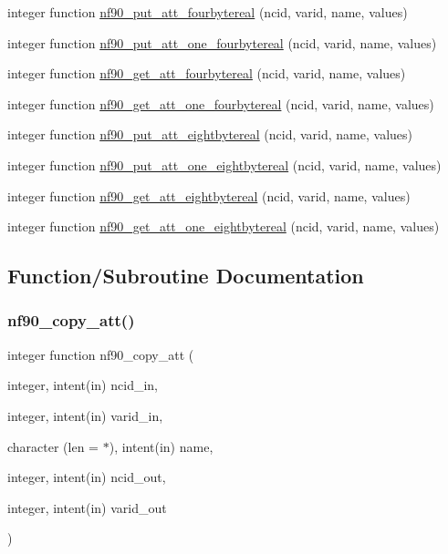 \begin{DoxyCompactItemize}
\item 
integer function \hyperlink{netcdf__attributes_8f90_a19a744e71982424f0959ba3694ec27ef}{nf90\+\_\+put\+\_\+att\+\_\+fourbytereal} (ncid, varid, name, values)
\item 
integer function \hyperlink{netcdf__attributes_8f90_aedfd0d57d585bb455050d55f04872273}{nf90\+\_\+put\+\_\+att\+\_\+one\+\_\+fourbytereal} (ncid, varid, name, values)
\item 
integer function \hyperlink{netcdf__attributes_8f90_a1f0e09b16f01e6e4b9deacba403bac61}{nf90\+\_\+get\+\_\+att\+\_\+fourbytereal} (ncid, varid, name, values)
\item 
integer function \hyperlink{netcdf__attributes_8f90_aea7a3824f9ca8df04723def3de3ff9c2}{nf90\+\_\+get\+\_\+att\+\_\+one\+\_\+fourbytereal} (ncid, varid, name, values)
\item 
integer function \hyperlink{netcdf__attributes_8f90_ade183ddaf5b09e6487a3dcf797d2686c}{nf90\+\_\+put\+\_\+att\+\_\+eightbytereal} (ncid, varid, name, values)
\item 
integer function \hyperlink{netcdf__attributes_8f90_ab3ab0461f63ffd2f1067ed51a7a75aa0}{nf90\+\_\+put\+\_\+att\+\_\+one\+\_\+eightbytereal} (ncid, varid, name, values)
\item 
integer function \hyperlink{netcdf__attributes_8f90_a89dc7198d6cec513e5ada471a0fe7a37}{nf90\+\_\+get\+\_\+att\+\_\+eightbytereal} (ncid, varid, name, values)
\item 
integer function \hyperlink{netcdf__attributes_8f90_a6149e70bb700cb94ea5f140a3035edfa}{nf90\+\_\+get\+\_\+att\+\_\+one\+\_\+eightbytereal} (ncid, varid, name, values)
\end{DoxyCompactItemize}


\subsection{Function/\+Subroutine Documentation}
\mbox{\label{netcdf__attributes_8f90_a42bb0b2dd7b076dbce30dfa444cd6da4}} 
\subsubsection{\texorpdfstring{nf90\+\_\+copy\+\_\+att()}{nf90\_copy\_att()}}
{\footnotesize\ttfamily integer function nf90\+\_\+copy\+\_\+att (\begin{DoxyParamCaption}\item[{integer, intent(in)}]{ncid\+\_\+in,  }\item[{integer, intent(in)}]{varid\+\_\+in,  }\item[{character (len = $\ast$), intent(in)}]{name,  }\item[{integer, intent(in)}]{ncid\+\_\+out,  }\item[{integer, intent(in)}]{varid\+\_\+out }\end{DoxyParamCaption})}



